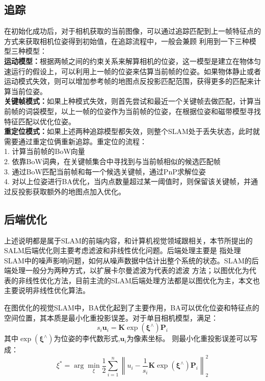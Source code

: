 \subsection{追踪}
在初始化成功后，对于相机获取的当前图像，可以通过追踪匹配到上一帧特征点的方式来获取相机位姿得到初始值，在追踪流程中，一般会兼顾
利用到一下三种模型三种模型：\\
\textbf{运动模型：}根据两帧之间的约束关系来解算相机的位姿，这一模型是建立在物体匀速运行的假设上，可以利用上一帧的位姿来估算当前帧的位姿。如果物体静止或者运动模式失效，则可以增加参考帧的地图点反投影匹配范围，获得更多的匹配来计算当前位姿。\\
\textbf{关键帧模式：}如果上种模式失效，则首先尝试和最近一个关键帧去做匹配，计算当前帧的词袋模型，以上一帧的位姿作为当前帧的位姿，在根据位姿和磁带模型寻找特征匹配以优化位姿。\\
\textbf{重定位模式：}如果上述两种追踪模型都失效，则整个SLAM处于丢失状态，此时就需要通过重定位俩重新追踪。重定位的流程：\\
1.	计算当前帧的BoW向量\\
2.	依靠BoW词典，在关键帧集合中寻找到与当前帧相似的候选匹配帧\\
3.	通过BoW匹配当前帧和每一个候选关键帧，通过PnP求解位姿\\
4.	对以上位姿进行BA优化，当内点数量超过某一阈值时，则保留该关键帧，并通过反投影获取额外的地图点加入优化。\\
\subsection{后端优化}
上述说明都是属于SLAM的前端内容，和计算机视觉领域跟相关，本节所提出的SALM后端优化则主要考虑滤波和非线性优化问题。后端处理主要是
指处理SLAM中的噪声影响问题，如何从噪声数据中估计出整个系统的状态。SLAM的后端处理一般分为两种方式，以扩展卡尔曼滤波为代表的滤波
方法；以图优化为代表的非线性优化方法，目前主流的SLAM后端处理方法都是以图优化为主，本文也主要说明非线性优化算法。

在图优化的视觉SLAM中，BA优化起到了主要作用，BA可以优化位姿和特征点的空间位置，其本质是最小化重投影误差。对于单目相机模型，满足：
\begin{equation}
  s_{i} \boldsymbol{u}_{i}=\boldsymbol{K} \exp \left(\boldsymbol{\xi}^{\wedge}\right) \boldsymbol{P}_{i}
\end{equation}
其中$\exp (\boldsymbol{\xi}^{\wedge})$为位姿的李代数形式,$ \boldsymbol{u}_{i}$为像素坐标。
则最小化重投影误差可以写成：
\begin{equation}
  \xi^{*}=\arg \min _{\xi} \frac{1}{2} \sum_{i=1}^{n}\left\|u_{i}-\frac{1}{s_{i}} \boldsymbol{K} \exp \left(\boldsymbol{\xi}^{\wedge}\right) \boldsymbol{P}_{i}\right\|_{2}^{2}
\end{equation}


